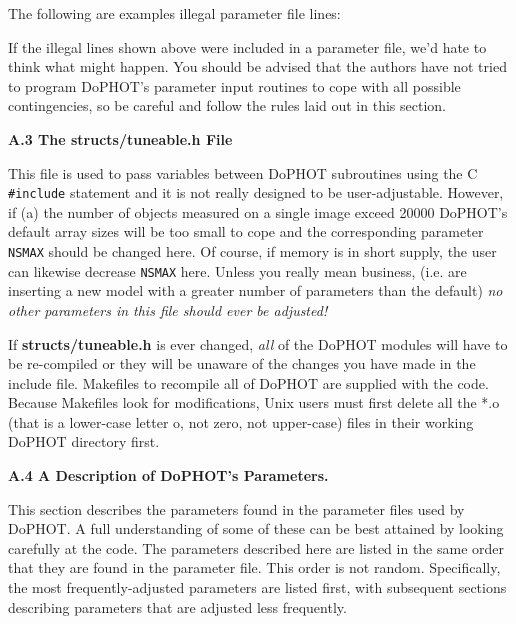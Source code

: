 The following are examples illegal parameter file lines:





\noindent  If the illegal lines shown above were  included in a parameter 
file, we'd hate to think what might happen.  You should be advised that
the authors have not tried to program DoPHOT's parameter 
input routines to cope with all possible contingencies, so be careful and follow 
the rules laid out in this section.

\centerline{\bf A.3  The {\bf structs/tuneable.h} File}

This file is used to pass variables between DoPHOT subroutines
using the C {\tt \#include} statement and it is not really designed to
be user-adjustable.  However, if (a) the number of objects measured on
a single image exceed 20000 DoPHOT's default array sizes 
will be too small to cope and the corresponding parameter {\tt NSMAX} 
should be changed here.  Of course, if memory is in short supply, the user 
can likewise decrease {\tt NSMAX} here.  Unless you really mean business, 
(i.e. are inserting a new model with a greater number of parameters than 
the default) {\it no other parameters in this file should ever be adjusted!}   

If {\bf structs/tuneable.h} is ever changed, 
{\it all} of the DoPHOT modules will have to be re-compiled or they 
will be unaware of the changes you have made in the include file.  
Makefiles to recompile all of DoPHOT are supplied with the code.  
Because Makefiles look for modifications, Unix users must first delete all 
the *.o (that is a lower-case letter o, not zero, not upper-case) files in their 
working DoPHOT directory first.

\centerline{\bf A.4 A Description of DoPHOT's Parameters.}

This section describes the parameters found in the parameter
files used by DoPHOT.  A full understanding of some of these
can be best attained by looking carefully at the code.   The
parameters described here are listed in the same order that
they are found in the parameter file.  This order is not
random.  Specifically, the most frequently-adjusted parameters
are listed first, with subsequent sections describing parameters that
are adjusted less frequently.

